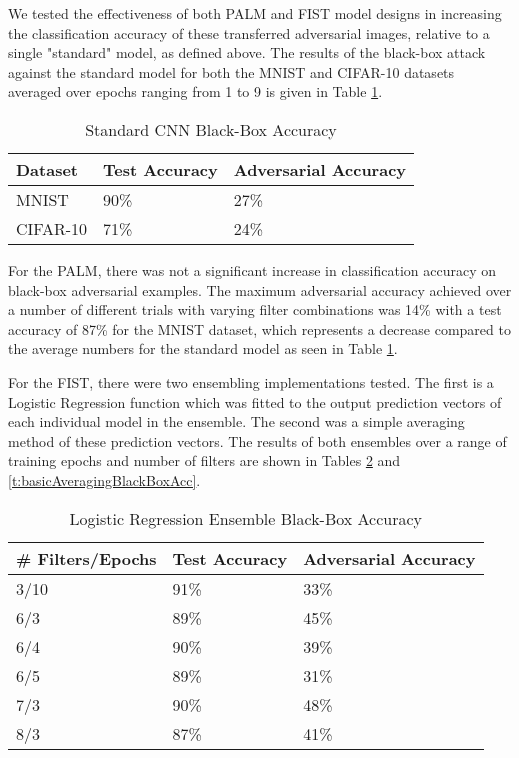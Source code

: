 We tested the effectiveness of both PALM and FIST model designs in increasing the classification accuracy of these transferred adversarial images, relative to a single "standard" model, as defined above.
The results of the black-box attack against the standard model for both the MNIST and CIFAR-10 datasets averaged over epochs ranging from 1 to 9 is given in Table \ref{t:standardBlackBoxAcc}.
\begin{table}
    \begin{center}
        \caption{Standard CNN Black-Box Accuracy}
        \label{t:standardBlackBoxAcc}
        \begin{tabular}{l|l|l}\hline
        \textbf{Dataset} & \textbf{Test Accuracy} & \textbf{Adversarial Accuracy}\\\hline
        MNIST & 90\% & 27\% \\\hline
        CIFAR-10 & 71\% & 24\% \\\hline
        \end{tabular}
    \end{center}
\end{table}

For the PALM, there was not a significant increase in classification accuracy on black-box adversarial examples.
The maximum adversarial accuracy achieved over a number of different trials with varying filter combinations was 14\% with a test accuracy of 87\% for the MNIST dataset, which represents a decrease compared to the average numbers for the standard model as seen in Table \ref{t:standardBlackBoxAcc}.

For the FIST, there were two ensembling implementations tested.
The first is a Logistic Regression function which was fitted to the output prediction vectors of each individual model in the ensemble.
The second was a simple averaging method of these prediction vectors.
The results of both ensembles over a range of training epochs and number of filters are shown in Tables \ref{t:logisticRegressionBlackBoxAcc} and \ref{t:basicAveragingBlackBoxAcc}.

\begin{table}
    \begin{center}
        \caption{Logistic Regression Ensemble Black-Box Accuracy}
        \label{t:logisticRegressionBlackBoxAcc}
        \begin{tabular}{l|l|l}\hline
        \textbf{\# Filters/Epochs} & \textbf{Test Accuracy} & \textbf{Adversarial Accuracy}\\\hline
        3/10 & 91\% & 33\% \\\hline
        6/3 & 89\% & 45\% \\\hline
        6/4 & 90\% & 39\% \\\hline
        6/5 & 89\% & 31\% \\\hline
        7/3 & 90\% & 48\% \\\hline
        8/3 & 87\% & 41\% \\\hline
        \end{tabular}
    \end{center}
\end{table}

